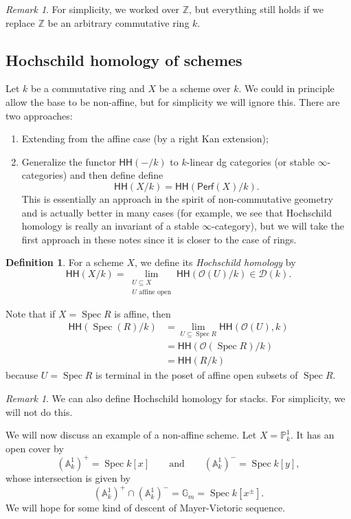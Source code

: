 \documentclass[10pt, oneside]{memoir}
\theoremstyle{definition}
\newtheorem{defn}[thm]{Definition}
\theoremstyle{remark}
\newtheorem{rmk}[thm]{Remark}
\theoremstyle{plain}
\theoremstyle{definition}
\theoremstyle{remark}
\newcommand{\A}{\mathbb{A}}
\newcommand{\G}{\mathbb{G}}
\newcommand{\Z}{\mathbb{Z}}
\renewcommand{\P}{\mathbb{P}}
\newcommand{\mc}[1]{\mathcal{#1}}
\newcommand{\ms}[1]{\mathsf{#1}}
\newcommand{\1}{\mathbf{1}}
\newcommand{\2}{\mathbf{2}}
\newcommand{\3}{\mathbf{3}}
\newcommand{\HH}{\ms{HH}}
\DeclareMathOperator{\Spec}{Spec}
\begin{document}
\begin{rmk}
    For simplicity, we worked over $\Z$, but everything still holds if we replace $\Z$ be an arbitrary commutative ring $k$.
\end{rmk}

\subsection{Hochschild homology of schemes}%
\label{sub:Hochschild homology of schemes}

Let $k$ be a commutative ring and $X$ be a scheme over $k$. We could in principle allow the base to be non-affine, but for simplicity we will ignore this. There are two approaches:
\begin{enumerate}
    \item Extending from the affine case (by a right Kan extension);
    \item Generalize the functor $\HH(-/k)$ to $k$-linear dg categories (or stable $\infty$-categories) and then define define
    \[ \HH(X/k) = \HH(\ms{Perf}(X)/k). \]
    This is essentially an approach in the spirit of non-commutative geometry and is actually better in many cases (for example, we see that Hochschild homology is really an invariant of a stable $\infty$-category), but we will take the first approach in these notes since it is closer to the case of rings.
\end{enumerate}

\begin{defn}
    For a scheme $X$, we define its \textit{Hochschild homology} by
    \[ \HH(X/k) = \lim_{\substack{U \subseteq X \\ U \text{ affine open}}} \HH(\mc{O}(U)/k) \in \mc{D}(k). \]
\end{defn}

Note that if $X = \Spec R$ is affine, then
\begin{align*}
    \HH(\Spec(R)/k) &= \lim_{U \subseteq \Spec R} \HH(\mc{O}(U), k) \\
    &= \HH(\mc{O}(\Spec R)/k) \\
    &= \HH(R/k)
\end{align*}
because $U = \Spec R$ is terminal in the poset of affine open subsets of $\Spec R$.

\begin{rmk}
    We can also define Hochschild homology for stacks. For simplicity, we will not do this.
\end{rmk}


We will now discuss an example of a non-affine scheme. Let $X = \P^1_k$. It has an open cover by
\[ (\A^1_k)^+ = \Spec k[x] \qquad \text{and} \qquad (\A_k^1)^- = \Spec k[y], \]
whose intersection is given by
\[ (\A_k^1)^+ \cap (\A_k^1)^- = \G_m = \Spec k[x^{\pm}]. \]
We will hope for some kind of descent of Mayer-Vietoric sequence.
\end{document}
